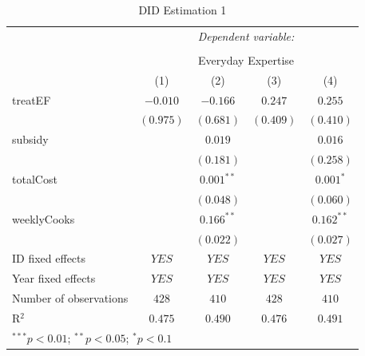 \documentclass[12pt, a4paper, titlepage]{article}\usepackage[]{graphicx}\usepackage[]{color}
\begin{document}
\begin{table}
\begin{center}
\begin{tabular}{l c c c c}
& \multicolumn{4}{c}{\textit{Dependent variable:}} \\
\cline{2-5}
\\[-1.8ex] & \multicolumn{4}{c}{Everyday Expertise} \\
\hline
 & (1) & (2) & (3) & (4) \\
\hline
treatEF                & $-0.010$  & $-0.166$     & $0.247$   & $0.255$      \\
                       & $(0.975)$ & $(0.681)$    & $(0.409)$ & $(0.410)$    \\
subsidy                &           & $0.019$      &           & $0.016$      \\
                       &           & $(0.181)$    &           & $(0.258)$    \\
totalCost              &           & $0.001^{**}$ &           & $0.001^{*}$  \\
                       &           & $(0.048)$    &           & $(0.060)$    \\
weeklyCooks            &           & $0.166^{**}$ &           & $0.162^{**}$ \\
                       &           & $(0.022)$    &           & $(0.027)$    \\
\hline
ID fixed effects       & $YES$     & $YES$        & $YES$     & $YES$        \\
Year fixed effects     & $YES$     & $YES$        & $YES$     & $YES$        \\
Number of observations & $428$     & $410$        & $428$     & $410$        \\
R$^2$                  & $0.475$   & $0.490$      & $0.476$   & $0.491$      \\
\hline
\multicolumn{5}{l}{\scriptsize{$^{***}p<0.01$; $^{**}p<0.05$; $^{*}p<0.1$}}
\end{tabular}
\caption{DID Estimation 1}
\label{table:coefficients3}
\end{center}
\end{table}
\end{document}
